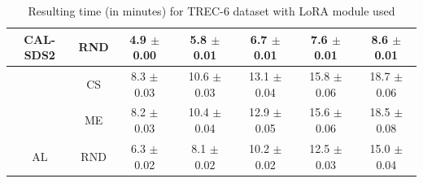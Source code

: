\begin{table}[htbp]
\begin{tabular*}{\linewidth}{c|c|@{\extracolsep{\fill}}ccccc}
\multirow{-3}{*}{\raggedright\arraybackslash CAL-SDS2} & RND & 4.9 $\pm$ {\small 0.00} & 5.8 $\pm$ {\small 0.01} & 6.7 $\pm$ {\small 0.01} & 7.6 $\pm$ {\small 0.01} & 8.6 $\pm$ {\small 0.01}\\
\midrule
 & CS & 8.3 $\pm$ {\small 0.03} & 10.6 $\pm$ {\small 0.03} & 13.1 $\pm$ {\small 0.04} & 15.8 $\pm$ {\small 0.06} & 18.7 $\pm$ {\small 0.06}\\

 & ME & 8.2 $\pm$ {\small 0.03} & 10.4 $\pm$ {\small 0.04} & 12.9 $\pm$ {\small 0.05} & 15.6 $\pm$ {\small 0.06} & 18.5 $\pm$ {\small 0.08}\\

\multirow{-3}{*}{\raggedright\arraybackslash AL} & RND & 6.3 $\pm$ {\small 0.02} & 8.1 $\pm$ {\small 0.02} & 10.2 $\pm$ {\small 0.02} & 12.5 $\pm$ {\small 0.03} & 15.0 $\pm$ {\small 0.04}\\
\bottomrule
\end{tabular*}
\caption{Resulting time (in minutes) for TREC-6 dataset with LoRA module used}
\label{tab:time_full_trec_10_lora}
\end{table}
